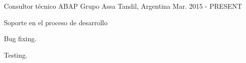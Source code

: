 


\begin{cventries}


\cventry
{Consultor técnico ABAP} %
{Grupo Assa} %
{Tandil, Argentina} %
{Mar. 2015 - PRESENT} %
{ %
\begin{cvitems}
\item {Soporte en el proceso de desarrollo}
\item {Bug fixing.}
\item {Testing.}
\end{cvitems}
}



\end{cventries}

